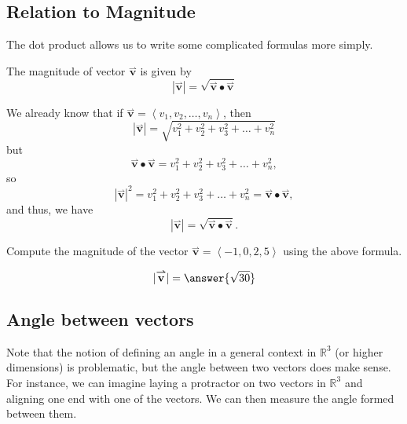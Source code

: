 \documentclass{ximera}
\begin{document}
\subsection{Relation to Magnitude} 
The dot product allows us to write some complicated formulas more simply.

\begin{theorem}
  The magnitude of vector $\overset{\boldsymbol{\rightharpoonup}}{\mathbf{v}}$ is given by
  \[
  |\overset{\boldsymbol{\rightharpoonup}}{\mathbf{v}}|=\sqrt{\overset{\boldsymbol{\rightharpoonup}}{\mathbf{v}} \bullet \overset{\boldsymbol{\rightharpoonup}}{\mathbf{v}}}
  \]
  \begin{explanation}
    We already know that if $\overset{\boldsymbol{\rightharpoonup}}{\mathbf{v}} = \left< v_1,v_2,\dots,v_n \right>$,
    then
    \[
    |\overset{\boldsymbol{\rightharpoonup}}{\mathbf{v}}| = \sqrt{v_1^2+v_2^2+v_3^2+\dots+v_n^2}
    \]
    but
    \[
    \overset{\boldsymbol{\rightharpoonup}}{\mathbf{v}} \bullet \overset{\boldsymbol{\rightharpoonup}}{\mathbf{v}} = v_1^2+v_2^2+v_3^2+\dots+v_n^2,
    \]
    so
    \[
    |\overset{\boldsymbol{\rightharpoonup}}{\mathbf{v}}|^2= v_1^2+v_2^2+v_3^2+\dots+v_n^2 = \overset{\boldsymbol{\rightharpoonup}}{\mathbf{v}} \bullet \overset{\boldsymbol{\rightharpoonup}}{\mathbf{v}},
    \]
    and thus, we have 
      \[
  |\overset{\boldsymbol{\rightharpoonup}}{\mathbf{v}}|=\sqrt{\overset{\boldsymbol{\rightharpoonup}}{\mathbf{v}} \bullet \overset{\boldsymbol{\rightharpoonup}}{\mathbf{v}}}.
  \]
  \end{explanation}
\end{theorem}

\begin{question}
  Compute the magnitude of the vector $\overset{\boldsymbol{\rightharpoonup}}{\mathbf{v}} = \left< -1,0,2,5 \right>$ using the above formula.
  \begin{prompt}
    \[
    |\overset{\boldsymbol{\rightharpoonup}}{\mathbf{v}}| = \answer{\sqrt{30}}
    \]
  \end{prompt}
\end{question}



\subsection{Angle between vectors}

Note that the notion of defining an angle in a general context in $\mathbb{R}^3$ (or higher dimensions) is problematic, but the angle between two vectors does make sense.  For instance, we can imagine laying a protractor on two vectors in $\mathbb{R}^3$ and aligning one end with one of the vectors.  We can then measure the angle formed between them.
\end{document}
